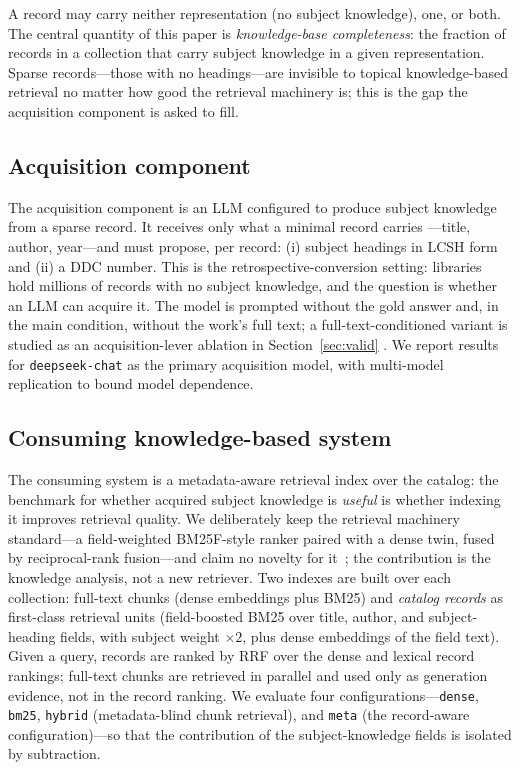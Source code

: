 A record may carry neither representation (no subject knowledge), one, or
both. The central quantity of this paper is \emph{knowledge-base
completeness}: the fraction of records in a collection that carry subject
knowledge in a given representation. Sparse records---those with no
headings---are invisible to topical knowledge-based retrieval no matter how
good the retrieval machinery is; this is the gap the acquisition component
is asked to fill.

\subsection{Acquisition component}
\label{sec:method:acquisition}

The acquisition component is an LLM configured to produce subject knowledge
from a sparse record. It receives only what a minimal record carries
---title, author, year---and must propose, per record: (i) subject headings
in LCSH form and (ii) a DDC number. This is the retrospective-conversion
setting: libraries hold millions of records with no subject knowledge, and
the question is whether an LLM can acquire it. The model is prompted without
the gold answer and, in the main condition, without the work's full text;
a full-text-conditioned variant is studied as an acquisition-lever ablation
in Section~\ref{sec:valid} . We report results for
\texttt{deepseek-chat} as the primary acquisition model, with
multi-model replication  to bound model dependence.

\subsection{Consuming knowledge-based system}
\label{sec:method:system}

The consuming system is a metadata-aware retrieval index over the catalog:
the benchmark for whether acquired subject knowledge is \emph{useful} is
whether indexing it improves retrieval quality. We deliberately keep the
retrieval machinery standard---a field-weighted BM25F-style ranker
paired with a dense twin, fused by reciprocal-rank fusion---and claim no
novelty for it~\cite{bm25f, prf_bm25}; the contribution is the knowledge
analysis, not a new retriever. Two indexes are built over each collection:
full-text chunks (dense embeddings plus BM25) and \emph{catalog records} as
first-class retrieval units (field-boosted BM25 over title, author, and
subject-heading fields, with subject weight $\times2$, plus dense embeddings
of the field text). Given a query, records are ranked by RRF over the dense
and lexical record rankings; full-text chunks are retrieved in parallel and
used only as generation evidence, not in the record ranking. We evaluate
four configurations---\texttt{dense}, \texttt{bm25}, \texttt{hybrid}
(metadata-blind chunk retrieval), and \texttt{meta} (the record-aware
configuration)---so that the contribution of the subject-knowledge fields is
isolated by subtraction.

